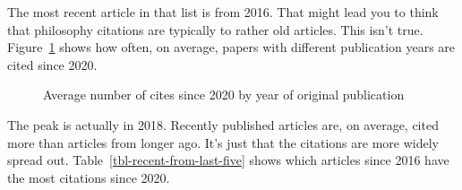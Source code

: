 \documentclass[
  10pt,
  letterpaper,
  DIV=11,
  numbers=noendperiod,
  twoside]{scrartcl}
\begin{document}
The most recent article in that list is from 2016. That might lead you
to think that philosophy citations are typically to rather old articles.
This isn't true. Figure~\ref{fig-recent-cite-rate} shows how often, on
average, papers with different publication years are cited since 2020.

\begin{figure}


\caption{\label{fig-recent-cite-rate}Average number of cites since 2020
by year of original publication}

\end{figure}%

The peak is actually in 2018. Recently published articles are, on
average, cited more than articles from longer ago. It's just that the
citations are more widely spread out.
Table~\ref{tbl-recent-from-last-five} shows which articles since 2016
have the most citations since 2020.
\end{document}
